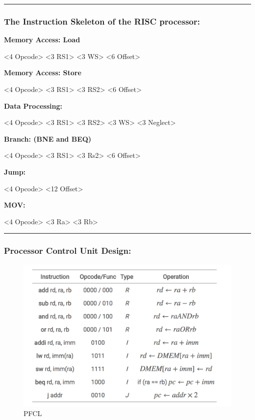 \documentclass[11pt]{article}
\makeatletter
\def\maxwidth{\ifdim\Gin@nat@width>\linewidth\linewidth
    \else\Gin@nat@width\fi}
\let\Oldincludegraphics\includegraphics
\renewcommand{\includegraphics}[1]{\Oldincludegraphics[width=.8\maxwidth]{#1}}
\makeatother
\begin{document}
\begin{center}\rule{0.5\linewidth}{\linethickness}\end{center}

\subsubsection{The Instruction Skeleton of the RISC
processor:}\label{the-instruction-skeleton-of-the-risc-processor}

\textbf{Memory Access: Load}

\textless{}4 Opcode\textgreater{} \textless{}3 RS1\textgreater{}
\textless{}3 WS\textgreater{} \textless{}6 Offset\textgreater{}

\textbf{Memory Access: Store}

\textless{}4 Opcode\textgreater{} \textless{}3 RS1\textgreater{}
\textless{}3 RS2\textgreater{} \textless{}6 Offset\textgreater{}

\textbf{Data Processing:}

\textless{}4 Opcode\textgreater{} \textless{}3 RS1\textgreater{}
\textless{}3 RS2\textgreater{} \textless{}3 WS\textgreater{}
\textless{}3 Neglect\textgreater{}

\textbf{Branch: (BNE and BEQ)}

\textless{}4 Opcode\textgreater{} \textless{}3 RS1\textgreater{}
\textless{}3 Rs2\textgreater{} \textless{}6 Offset\textgreater{}

\textbf{Jump:}

\textless{}4 Opcode\textgreater{} \textless{}12 Offset\textgreater{}

\textbf{MOV:}

\textless{}4 Opcode\textgreater{} \textless{}3 Ra\textgreater{}
\textless{}3 Rb\textgreater{}

\begin{center}\rule{0.5\linewidth}{\linethickness}\end{center}

\subsubsection{Processor Control Unit
Design:}\label{processor-control-unit-design}

\begin{figure}
\centering
\includegraphics{./opcode.png}
\caption{PFCL}
\end{figure}
\end{document}
